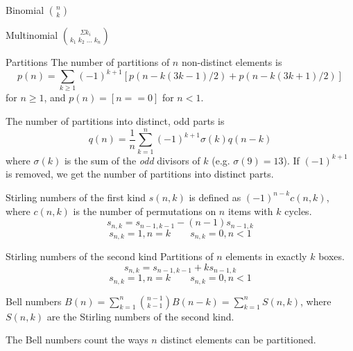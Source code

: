

\begin{algorithm}{Binomial $\binom{n}{k}$}
\end{algorithm}

\begin{algorithm}{Multinomial $\binom{\Sigma k_i}{k_1\;k_2\;\ldots\;k_n}$}
\end{algorithm}

\begin{algorithm}{Partitions}
\desc
The number of partitions of $n$ non-distinct elements is
$$p(n) = \sum_{k \ge 1} (-1)^{k+1} \left[p(n- k(3k-1)/2) + p(n-k(3k+1)/2)\right]$$
for $n \ge 1$, and $p(n) = [n == 0]$ for $n < 1$.

The number of partitions into distinct, odd parts is
$$q(n) = \frac{1}{n} \sum_{k = 1}^{n} (-1)^{k+1} \sigma(k) q(n-k)$$
where $\sigma(k)$ is the sum of the {\em odd} divisors of $k$
(e.g. $\sigma(9) = 13$).  If $(-1)^{k+1}$ is removed, we get the
number of partitions into distinct parts.

\end{algorithm}

\begin{algorithm}{Stirling numbers of the first kind}
\desc
$s(n,k)$ is defined as
$(-1)^{n-k}c(n,k)$, where $c(n,k)$ is the number of permutations on
$n$ items with $k$ cycles.
$$s_{n,k} = s_{n-1,k-1} - (n-1)s_{n-1,k}$$
$$s_{n,k} = 1, n = k \qquad s_{n,k} = 0, n < 1$$
\end{algorithm}

\begin{algorithm}{Stirling numbers of the second kind}
\desc
Partitions of $n$ elements in exactly $k$ boxes.
$$s_{n,k} = s_{n-1,k-1} + ks_{n-1,k}$$
$$s_{n,k} = 1, n = k \qquad s_{n,k} = 0, n < 1$$
\end{algorithm}

\begin{algorithm}{Bell numbers}
\desc
$B(n) = \sum_{k=1}^n \binom{n-1}{k-1} B(n-k) = \sum_{k=1}^n S(n,k)$,
where $S(n, k)$ are the Stirling numbers of the second kind.

The Bell numbers count the ways $n$ distinct elements can be partitioned.
\end{algorithm}

